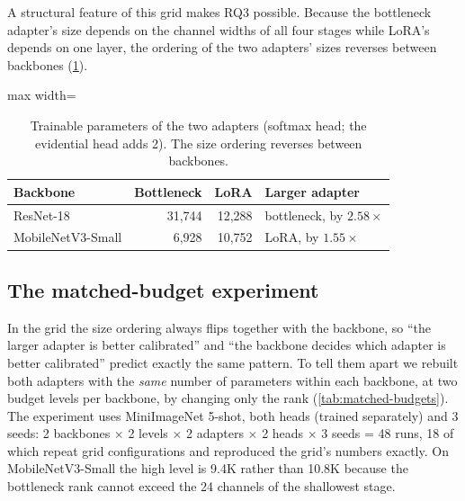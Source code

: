 A structural feature of this grid makes RQ3 possible. Because the bottleneck adapter's size depends on
the channel widths of all four stages while LoRA's depends on one layer, the ordering of the two adapters'
sizes reverses between backbones (\cref{tab:budgets}).

\begin{table}[H]
\centering
\caption{Trainable parameters of the two adapters (softmax head; the evidential head adds 2). The size
ordering reverses between backbones.}
\label{tab:budgets}
\begin{adjustbox}{max width=\textwidth}
\begin{tabular}{@{}lrrl@{}}
\toprule
Backbone & Bottleneck & LoRA & Larger adapter \\
\midrule
ResNet-18 & 31,744 & 12,288 & bottleneck, by $2.58\times$ \\
MobileNetV3-Small & 6,928 & 10,752 & LoRA, by $1.55\times$ \\
\bottomrule
\end{tabular}
\end{adjustbox}
\end{table}

\subsection{The matched-budget experiment}
\label{sec:matched-design}

In the grid the size ordering always flips together with the backbone, so ``the larger adapter is better
calibrated'' and ``the backbone decides which adapter is better calibrated'' predict exactly the same
pattern. To tell them apart we rebuilt both adapters with the \emph{same} number of parameters within each
backbone, at two budget levels per backbone, by changing only the rank (\cref{tab:matched-budgets}). The
experiment uses MiniImageNet 5-shot, both heads (trained separately) and 3 seeds: 2 backbones $\times$ 2
levels $\times$ 2 adapters $\times$ 2 heads $\times$ 3 seeds = 48 runs, 18 of which repeat grid
configurations and reproduced the grid's numbers exactly. On MobileNetV3-Small the high level is 9.4K
rather than 10.8K because the bottleneck rank cannot exceed the 24 channels of the shallowest stage.

